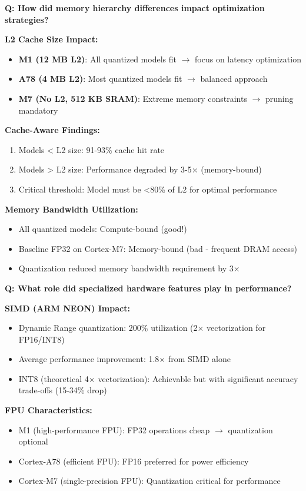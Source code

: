 \documentclass[10pt, a4paper]{article}
\begin{document}
\textbf{Q: How did memory hierarchy differences impact optimization strategies?}

\textbf{L2 Cache Size Impact:}
\begin{itemize}
    \item \textbf{M1 (12 MB L2)}: All quantized models fit $\rightarrow$ focus on latency optimization
    \item \textbf{A78 (4 MB L2)}: Most quantized models fit $\rightarrow$ balanced approach
    \item \textbf{M7 (No L2, 512 KB SRAM)}: Extreme memory constraints $\rightarrow$ pruning mandatory
\end{itemize}

\textbf{Cache-Aware Findings:}
\begin{enumerate}
    \item Models < L2 size: 91-93\% cache hit rate
    \item Models > L2 size: Performance degraded by 3-5× (memory-bound)
    \item Critical threshold: Model must be <80\% of L2 for optimal performance
\end{enumerate}

\textbf{Memory Bandwidth Utilization:}
\begin{itemize}
    \item All quantized models: Compute-bound (good!)
    \item Baseline FP32 on Cortex-M7: Memory-bound (bad - frequent DRAM access)
    \item Quantization reduced memory bandwidth requirement by 3×
\end{itemize}

\textbf{Q: What role did specialized hardware features play in performance?}

\textbf{SIMD (ARM NEON) Impact:}
\begin{itemize}
    \item Dynamic Range quantization: 200\% utilization (2× vectorization for FP16/INT8)
    \item Average performance improvement: 1.8× from SIMD alone
    \item INT8 (theoretical 4× vectorization): Achievable but with significant accuracy trade-offs (15-34\% drop)
\end{itemize}

\textbf{FPU Characteristics:}
\begin{itemize}
    \item M1 (high-performance FPU): FP32 operations cheap $\rightarrow$ quantization optional
    \item Cortex-A78 (efficient FPU): FP16 preferred for power efficiency
    \item Cortex-M7 (single-precision FPU): Quantization critical for performance
\end{itemize}
\end{document}
